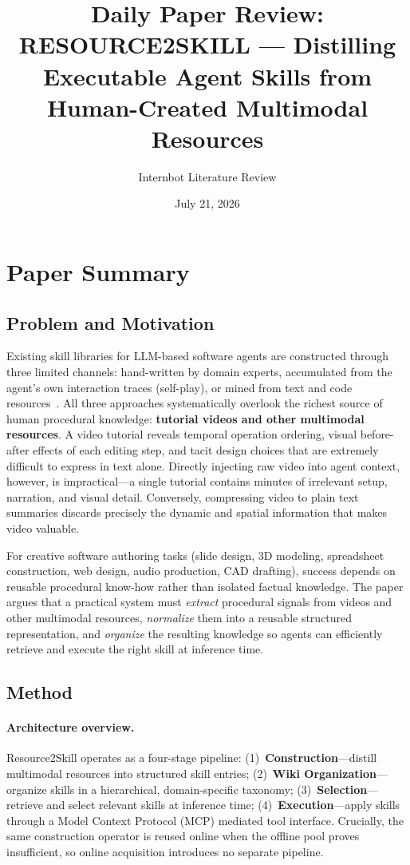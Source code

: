 \documentclass[11pt,a4paper]{article}
\title{Daily Paper Review: RESOURCE2SKILL --- Distilling Executable Agent Skills from Human-Created Multimodal Resources}
\author{Internbot Literature Review}
\date{July 21, 2026}
\begin{document}
\maketitle

\section{Paper Summary}

\subsection{Problem and Motivation}

Existing skill libraries for LLM-based software agents are constructed through three limited channels: hand-written by domain experts, accumulated from the agent's own interaction traces (self-play), or mined from text and code resources~\cite{fan2026resource2skill}. All three approaches systematically overlook the richest source of human procedural knowledge: \textbf{tutorial videos and other multimodal resources}. A video tutorial reveals temporal operation ordering, visual before-after effects of each editing step, and tacit design choices that are extremely difficult to express in text alone. Directly injecting raw video into agent context, however, is impractical---a single tutorial contains minutes of irrelevant setup, narration, and visual detail. Conversely, compressing video to plain text summaries discards precisely the dynamic and spatial information that makes video valuable.

For creative software authoring tasks (slide design, 3D modeling, spreadsheet construction, web design, audio production, CAD drafting), success depends on reusable procedural know-how rather than isolated factual knowledge. The paper argues that a practical system must \emph{extract} procedural signals from videos and other multimodal resources, \emph{normalize} them into a reusable structured representation, and \emph{organize} the resulting knowledge so agents can efficiently retrieve and execute the right skill at inference time.

\subsection{Method}

\paragraph{Architecture overview.}
Resource2Skill operates as a four-stage pipeline: (1)~\textbf{Construction}---distill multimodal resources into structured skill entries; (2)~\textbf{Wiki Organization}---organize skills in a hierarchical, domain-specific taxonomy; (3)~\textbf{Selection}---retrieve and select relevant skills at inference time; (4)~\textbf{Execution}---apply skills through a Model Context Protocol (MCP) mediated tool interface. Crucially, the same construction operator is reused online when the offline pool proves insufficient, so online acquisition introduces no separate pipeline.
\end{document}

